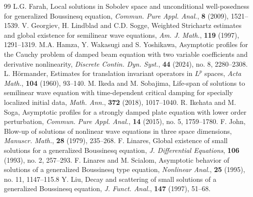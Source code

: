 \documentclass[10pt]{article}
\newcommand{\<}{\langle}
\renewcommand{\>}{\rangle}
\numberwithin{equation}{section}
\begin{document}
\begin{thebibliography}{99}
L.G. Farah, Local solutions in Sobolev space and unconditional well-posedness for generalized Boussinesq equation,
\textit{Commun. Pure Appl. Anal.}, \textbf{8} (2009), 1521--1539.
V. Georgiev, H. Lindblad and C.D. Sogge, Weighted Strichartz estimates and global existence for semilinear wave equations, \emph{Am. J. Math.}, \textbf{119} (1997), 1291--1319.
M.A. Hamza, Y. Wakasugi and S. Yoshikawa, Asymptotic profiles for the Cauchy problem of damped beam equation with two variable coefficients and derivative nonlinearity, \textit{Discrete Contin. Dyn. Syst.}, \textbf{44} (2024), no. 8, 2280--2308.
L. H\"{o}rmander, Estimates for translation invariant operators in $L^p$ spaces, \emph{Acta Math.}, \textbf{104} (1960), 93--140.
M. Ikeda and M. Sobajima, Life-span of solutions to semilinear wave equation with time-dependent critical damping for specially localized initial data, \textit{Math. Ann.}, \textbf{372} (2018), 1017--1040.
R. Ikehata and M. Soga, Asymptotic profiles for a strongly damped plate equation with lower order perturbation, \textit{Commun. Pure Appl. Anal.}, \textbf{14} (2015), no. 5, 1759--1780.
F. John, Blow-up of solutions of nonlinear wave equations in three space dimensions, \emph{Manuscr. Math.}, \textbf{28} (1979), 235--268.
F. Linares, Global existence of small solutions for a generalized Boussinesq equation, \textit{J. Differential Equations}, \textbf{106} (1993), no. 2, 257--293.
F. Linares and M. Scialom, Asymptotic behavior of solutions of a generalized Boussinesq type equation, \textit{Nonlinear Anal.}, \textbf{25} (1995), no. 11, 1147--115.8
Y. Liu, Decay and scattering of small solutions of a generalized Boussinesq equation, \textit{J. Funct. Anal.}, \textbf{147} (1997), 51--68.

\end{thebibliography}
\end{document}
